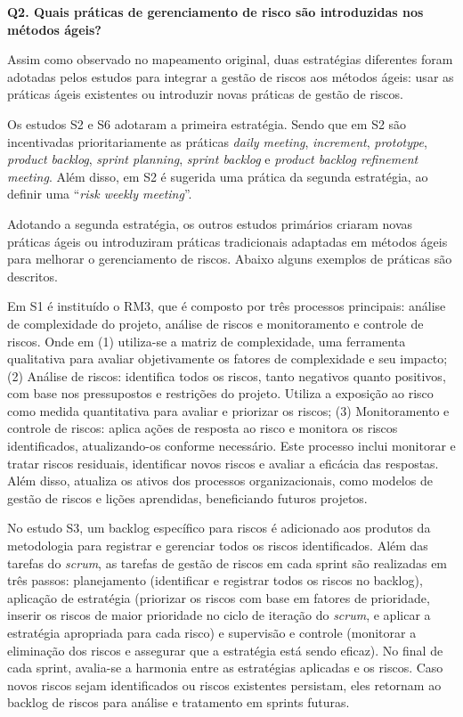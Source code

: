 \documentclass[
	12pt,
	openright,
	twoside,
	a4paper,
	english,
	brazil
	]{abntex2}
\begin{document}
\textbf{Q2. Quais práticas de gerenciamento de risco são introduzidas nos métodos ágeis?}

Assim como observado no mapeamento original, duas estratégias diferentes foram adotadas pelos estudos para integrar a gestão de riscos aos métodos ágeis: usar as práticas ágeis existentes ou introduzir novas práticas de gestão de riscos.

Os estudos S2 e S6 adotaram a primeira estratégia. Sendo que em S2 são incentivadas prioritariamente as práticas \textit{daily meeting}, \textit{increment}, \textit{prototype}, \textit{product backlog}, \textit{sprint planning}, \textit{sprint backlog} e \textit{product backlog refinement meeting}. Além disso, em S2 é sugerida uma prática da segunda estratégia, ao definir uma “\textit{risk weekly meeting}”.

Adotando a segunda estratégia, os outros estudos primários criaram novas práticas ágeis ou introduziram práticas tradicionais adaptadas em métodos ágeis para melhorar o gerenciamento de riscos. Abaixo alguns exemplos de práticas são descritos.

Em S1 é instituído o RM3, que é composto por três processos principais: análise de complexidade do projeto, análise de riscos e monitoramento e controle de riscos. Onde em (1) utiliza-se a matriz de complexidade, uma ferramenta qualitativa para avaliar objetivamente os fatores de complexidade e seu impacto; (2) Análise de riscos: identifica todos os riscos, tanto negativos quanto positivos, com base nos pressupostos e restrições do projeto. Utiliza a exposição ao risco como medida quantitativa para avaliar e priorizar os riscos; (3) Monitoramento e controle de riscos: aplica ações de resposta ao risco e monitora os riscos identificados, atualizando-os conforme necessário. Este processo inclui monitorar e tratar riscos residuais, identificar novos riscos e avaliar a eficácia das respostas. Além disso, atualiza os ativos dos processos organizacionais, como modelos de gestão de riscos e lições aprendidas, beneficiando futuros projetos.

No estudo S3, um backlog específico para riscos é adicionado aos produtos da metodologia para registrar e gerenciar todos os riscos identificados. Além das tarefas do \textit{scrum}, as tarefas de gestão de riscos em cada sprint são realizadas em três passos: planejamento (identificar e registrar todos os riscos no backlog), aplicação de estratégia (priorizar os riscos com base em fatores de prioridade, inserir os riscos de maior prioridade no ciclo de iteração do \textit{scrum}, e aplicar a estratégia apropriada para cada risco) e supervisão e controle (monitorar a eliminação dos riscos e assegurar que a estratégia está sendo eficaz). No final de cada sprint, avalia-se a harmonia entre as estratégias aplicadas e os riscos. Caso novos riscos sejam identificados ou riscos existentes persistam, eles retornam ao backlog de riscos para análise e tratamento em sprints futuras.
\end{document}
